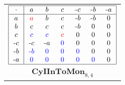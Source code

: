 \documentclass{amsart}
\newcommand{\g}{\textcolor{blue}}
\newcommand{\rd}{\textcolor{red}}
\newcommand{\m}{\rule[2pt]{3pt}{.5pt}\mkern1mu}
\newcommand{\W}[1]{\makebox[12pt]{$#1$}}%
\begin{document}
\ 
\ 
\begin{tabular}[b]{c}
$\begin{array}{|c|cccccc|}\hline
\W{\cdot}&\W{a}&\W{b}&\W{c}&\W{\m c}&\W{\m b}&\W{\m a}\\\hline
a&\rd{a}&b&c&\m b&\m b&0\\
b&c&c&c&\m b&0&0\\
c&\g{c}&\g{c}&\rd{c}&0&0&0\\
\m c&\m c&\m a&\g{0}&0&0&0\\
\m b&\g{\m b}&\g{0}&\g{0}&\g{0}&0&0\\
\m a&\g{0}&\g{0}&\g{0}&\g{0}&\g{0}&0\\
\hline
\end{array}$\\
$\mathbf{CyIInToMon}_{8,4}$
\end{tabular}
\ 
\end{document}
